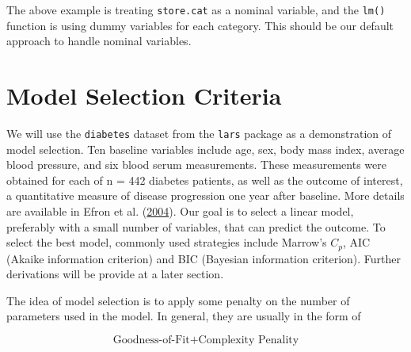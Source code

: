 \documentclass[
]{book}
\newenvironment{Shaded}{\begin{snugshade}}{\end{snugshade}}
\newcommand{\AttributeTok}[1]{\textcolor[rgb]{0.13,0.29,0.53}{#1}}
\newcommand{\CommentTok}[1]{\textcolor[rgb]{0.56,0.35,0.01}{\textit{#1}}}
\newcommand{\DocumentationTok}[1]{\textcolor[rgb]{0.56,0.35,0.01}{\textbf{\textit{#1}}}}
\newcommand{\FunctionTok}[1]{\textcolor[rgb]{0.13,0.29,0.53}{\textbf{#1}}}
\newcommand{\NormalTok}[1]{#1}
\newcommand{\OtherTok}[1]{\textcolor[rgb]{0.56,0.35,0.01}{#1}}
\newcommand{\SpecialCharTok}[1]{\textcolor[rgb]{0.81,0.36,0.00}{\textbf{#1}}}
\newcommand{\StringTok}[1]{\textcolor[rgb]{0.31,0.60,0.02}{#1}}
\theoremstyle{definition}
\theoremstyle{definition}
\theoremstyle{definition}
\theoremstyle{definition}
\theoremstyle{remark}
\begin{document}
The above example is treating \texttt{store.cat} as a nominal variable, and the \texttt{lm()} function is using dummy variables for each category. This should be our default approach to handle nominal variables.

\hypertarget{model-selection-criteria}{%
\section{Model Selection Criteria}\label{model-selection-criteria}}

We will use the \texttt{diabetes} dataset from the \texttt{lars} package as a demonstration of model selection. Ten baseline variables include age, sex, body mass index, average blood pressure, and six blood serum measurements. These measurements were obtained for each of n = 442 diabetes patients, as well as the outcome of interest, a quantitative measure of disease progression one year after baseline. More details are available in Efron et al. (\protect\hyperlink{ref-efron2004least}{2004}). Our goal is to select a linear model, preferably with a small number of variables, that can predict the outcome. To select the best model, commonly used strategies include Marrow's \(C_p\), AIC (Akaike information criterion) and BIC (Bayesian information criterion). Further derivations will be provide at a later section.

\begin{Shaded}
\end{Shaded}

The idea of model selection is to apply some penalty on the number of parameters used in the model. In general, they are usually in the form of

\[\text{Goodness-of-Fit} + \text{Complexity Penality}\]
\end{document}
